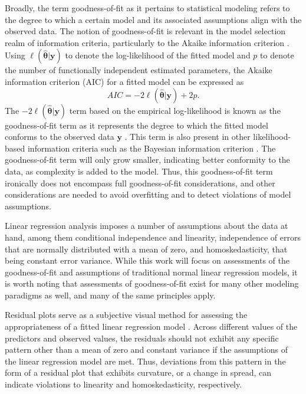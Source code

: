 \documentclass[sn-mathphys-ay]{sn-jnl}
\begin{document}
    		Broadly, the term goodness-of-fit as it pertains to statistical modeling refers to the degree to which a certain model
		and its associated assumptions align with the observed data. The notion of goodness-of-fit is relevant in the model selection realm of information criteria, particularly to the Akaike
		information criterion \citep{Akaike}. Using $\ell(\hat{\bm{\theta}}|\bm{y})$ to denote the log-likelihood of the fitted model and $p$ to denote the
		number of functionally independent estimated parameters, the Akaike information criterion (AIC) for a fitted model can be expressed as
		\begin{equation*}
			AIC = -2 \ell(\hat{\bm{\theta}}|\bm{y}) + 2 p.
		\end{equation*}
		The $-2 \ell(\hat{\bm{\theta}}|\bm{y})$ term based on the empirical log-likelihood is known as the goodness-of-fit term as it represents the degree to which the fitted model
		conforms to the observed data $\bm{y}$ \citep{Cavanaugh}. This term is also present in other likelihood-based information criteria such as the Bayesian information criterion \citep{Schwarz}.
		The goodness-of-fit term will only grow smaller, indicating better conformity to the data, as complexity is added to the model. Thus, this goodness-of-fit term ironically does
		not encompass full goodness-of-fit considerations, and other considerations are needed to avoid overfitting and to detect violations of model assumptions.

		Linear regression analysis imposes a number of assumptions about the data at hand, among them conditional independence and linearity, independence of errors that are normally distributed with a mean of zero,
		and homoskedasticity, that being constant error variance. While this work will focus on assessments of the goodness-of-fit and assumptions of traditional normal linear regression models, it is worth noting
		that assessments of goodness-of-fit exist for many other modeling paradigms as well, and many of the same principles apply.
		
		Residual plots serve as a subjective visual method for assessing the appropriateness of a fitted linear regression model \citep{Miles}. Across different values
		of the predictors and observed values, the residuals should not exhibit any specific pattern other than a mean of zero and constant variance if the assumptions of the linear regression model are met.
		Thus, deviations from this pattern in the form of a residual plot that exhibits curvature, or a change in spread, can indicate violations to linearity and homoskedasticity, respectively. 
\end{document}
